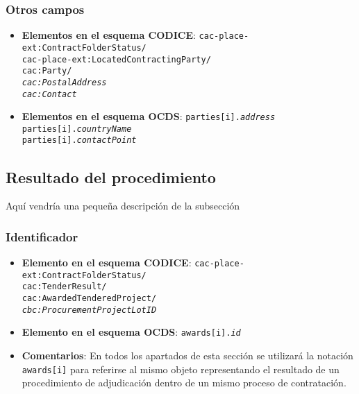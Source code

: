         \subsubsection{Otros campos}
            \begin{itemize}
                \item \textbf{Elementos en el esquema CODICE}:
                    \tabto{7.6cm} \texttt{cac-place-ext:ContractFolderStatus/} \\
                    \tabto{7.6cm} \texttt{cac-place-ext:LocatedContractingParty/} \\
                    \tabto{7.6cm} \texttt{cac:Party/} \\
                    \tabto{7.6cm} \texttt{\textit{cac:PostalAddress}} \\
                    \tabto{7.6cm} \texttt{\textit{cac:Contact}} \\
                \item \textbf{Elementos en el esquema OCDS}:
                    \tabto{7.6cm} \texttt{parties[i].\textit{address}} \\
                    \tabto{7.6cm} \texttt{parties[i].\textit{countryName}} \\
                    \tabto{7.6cm} \texttt{parties[i].\textit{contactPoint}}
            \end{itemize}
    
    \vspace{0.3cm}
    
    \subsection{Resultado del procedimiento}
        
        Aquí vendría una pequeña descripción de la subsección
    
        \subsubsection{Identificador}
            \begin{itemize}
                \item \textbf{Elemento en el esquema CODICE}:
                    \tabto{7.6cm} \texttt{cac-place-ext:ContractFolderStatus/} \\
                    \tabto{7.6cm} \texttt{cac:TenderResult/} \\
                    \tabto{7.6cm} \texttt{cac:AwardedTenderedProject/} \\
                    \tabto{7.6cm} \texttt{\textit{cbc:ProcurementProjectLotID}}
                \item \textbf{Elemento en el esquema OCDS}:
                    \tabto{7.6cm} \texttt{awards[i].\textit{id}}
                \item \textbf{Comentarios}: En todos los apartados de esta sección se utilizará la notación \texttt{awards[i]} para referirse al mismo objeto representando el resultado de un procedimiento de adjudicación dentro de un mismo proceso de contratación.
            \end{itemize}
            
